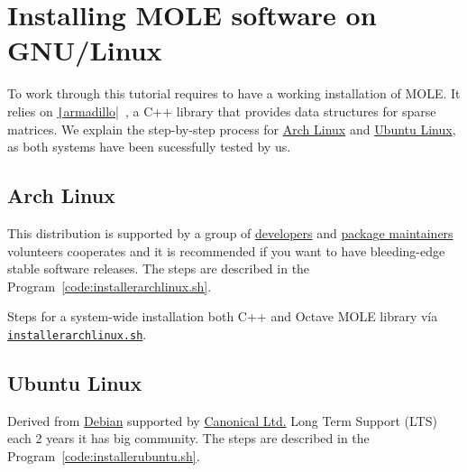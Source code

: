 \appendix

\chapter{Installing MOLE software on GNU/Linux}

To work through this tutorial requires to have a working installation
of MOLE.
It relies on
\href{https://gitlab.com/conradsnicta/armadillo-code}{\texttt|armadillo|}~\cite{Sanderson2025},
a C++ library that provides data structures for sparse matrices.
We explain the step-by-step process for
\href{https://wiki.archlinux.org/title/Pacman/Rosetta}{Arch Linux}
and \href{https://help.ubuntu.com/lts/ubuntu-help/index.html}{Ubuntu Linux},
as both systems have been sucessfully tested by us.

\section{Arch Linux}

This distribution is supported by a group of
\href{https://archlinux.org/people/developers}{developers} and
\href{https://archlinux.org/people/package-maintainers}{package maintainers}
volunteers cooperates and it is recommended if you want to have bleeding-edge stable
software releases.
The steps are described in the Program~\ref{code:installerarchlinux.sh}.

\begin{listing}[ht!]
	\tiny
	\centering
	\caption{Steps for a system-wide installation both C++ and Octave
		MOLE library vía
		\href{https://raw.githubusercontent.com/carlosal1015/mole_examples/main/tutorial/installerarchlinux.sh}{\texttt{installerarchlinux.sh}}.}
	\label{code:installerarchlinux.sh}
\end{listing}

\section{Ubuntu Linux}

Derived from \href{https://www.debian.org}{Debian} supported by
\href{https://canonical.com}{Canonical Ltd.} Long Term Support (LTS) each 2 years it has big community.
The steps are described in the Program~\ref{code:installerubuntu.sh}.


